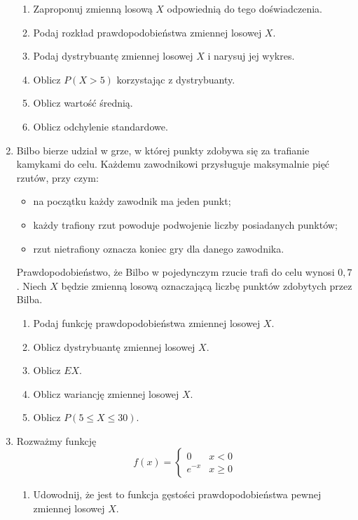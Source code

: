 \documentclass{mwart}
\newcommand{\ans}[1]{}
\newcommand{\ans}[1]{\emph{Odpowiedź:} #1}
\begin{document}
\begin{enumerate}
\begin{enumerate}
\item Zaproponuj zmienną losową $X$ odpowiednią do tego doświadczenia. \ans{$X\colon\Omega\to\{1,\ldots,12\}$}
\item Podaj rozkład prawdopodobieństwa zmiennej losowej $X$. \ans{$(1,2,3,4,5,6,5,4,3,2,1)/36$}
\item Podaj dystrybuantę zmiennej losowej $X$ i narysuj jej wykres.
\item Oblicz $P(X>5)$ korzystając z dystrybuanty.
\item Oblicz wartość średnią. \ans{$7$}
\item Oblicz odchylenie standardowe. \ans{$\sqrt{D^2X}=\sqrt{54{,}83-49}=2{,}42$}
\end{enumerate}
\item Bilbo bierze udział w grze, w której punkty zdobywa się za trafianie kamykami do celu. Każdemu zawodnikowi przysługuje maksymalnie pięć rzutów, przy czym:
\begin{itemize}
\item na początku każdy zawodnik ma jeden punkt;
\item każdy trafiony rzut powoduje podwojenie liczby posiadanych punktów;
\item rzut nietrafiony oznacza koniec gry dla danego zawodnika.
\end{itemize}
Prawdopodobieństwo, że Bilbo w pojedynczym rzucie trafi do celu wynosi $0{,}7$. Niech $X$ będzie zmienną losową oznaczającą liczbę punktów zdobytych przez
Bilba.
\begin{enumerate}
\item Podaj funkcję prawdopodobieństwa zmiennej losowej $X$.
\item Oblicz dystrybuantę zmiennej losowej $X$.
\item Oblicz $EX$.
\item Oblicz wariancję zmiennej losowej $X$.
\item Oblicz $P(5\leq X\leq 30)$.
\end{enumerate}
\item Rozważmy funkcję \[f(x)=\begin{cases} 0 & x<0 \\ e^{-x} & x\geq 0\end{cases} \]
\begin{enumerate}
\item Udowodnij, że jest to funkcja gęstości prawdopodobieństwa pewnej zmiennej losowej $X$. \ans{nieujemna, $\int_{-\infty}^\infty f(x)dx=0+\int_0^\infty f(x)dx=1$}

\end{enumerate}
\end{enumerate}
\end{document}
